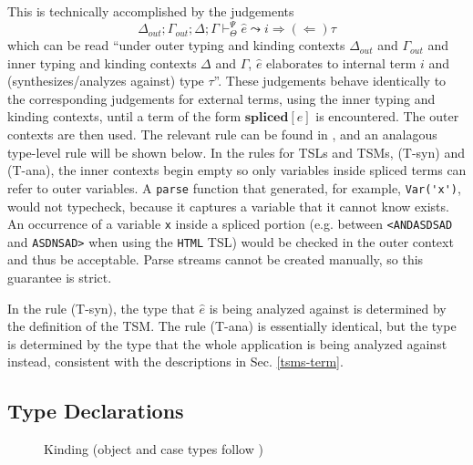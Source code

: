 \documentclass{sig-alternate}[10pt]
\newcommand{\lstinlinew}[1]{\lstinline[style=wyvern]{#1}}
\newcommand{\flyingbox}[1]{\fbox{{#1}}}
\newcommand{\mycaption}[1]{\vspace{-10px}\caption{#1}\vspace{-10px}}
\begin{document}
This is technically accomplished by the judgements \[\Delta_{out}; \Gamma_{out}; \Delta; \Gamma \vdash_{\Theta}^{\Psi} \hat{e} \leadsto i {\Rightarrow}{(\Leftarrow)} \tau\]  which can be read ``under outer typing and kinding contexts $\Delta_{out}$ and $\Gamma_{out}$ and inner typing and kinding contexts $\Delta$ and $\Gamma$,  $\hat{e}$ elaborates to internal term $i$ and (synthesizes/analyzes against) type $\tau$''. These judgements behave identically to the corresponding judgements for external terms, using the inner typing and kinding contexts, until a term of the form $\textbf{spliced}[e]$ is encountered. The outer contexts are then used. The relevant rule can be found in \cite{TSLs}, and an analagous type-level rule will be shown below. 
In the rules for TSLs and TSMs, (T-syn) and (T-ana), the inner contexts begin empty so only variables inside spliced terms can refer to outer variables. A \lstinlinew{parse} function that generated, for example, \lstinlinew{Var('x')}, would not typecheck, because it captures a variable that it cannot know exists. An occurrence of a variable \lstinlinew{x} inside a spliced portion (e.g. between \lstinlinew{<ANDASDSAD} and \lstinlinew{ASDNSAD>} when using the \lstinlinew{HTML} TSL) would be checked in the outer context and thus be acceptable. Parse streams cannot be created manually, so this guarantee is strict. %

In the rule (T-syn), the type that $\hat{e}$ is being analyzed against is determined by the definition of the TSM. The rule (T-ana) is essentially identical, but the type is determined by the type that the whole application is being analyzed against instead, consistent with the descriptions in Sec. \ref{tsms-term}. 


\subsection{Type Declarations}\label{declarations}




\begin{figure}[ht]
\flyingbox{$\Delta\vdash_{\Theta}\tau::\kappa$}
\begin{center}
\noLine
\BIC{}
\DP
\end{center}

\begin{center}
\noLine
\BIC{}
\DP
\end{center}
\mycaption{Kinding (object and case types follow \cite{TSLs})}
\label{kinding}
\end{figure}
\end{document}
